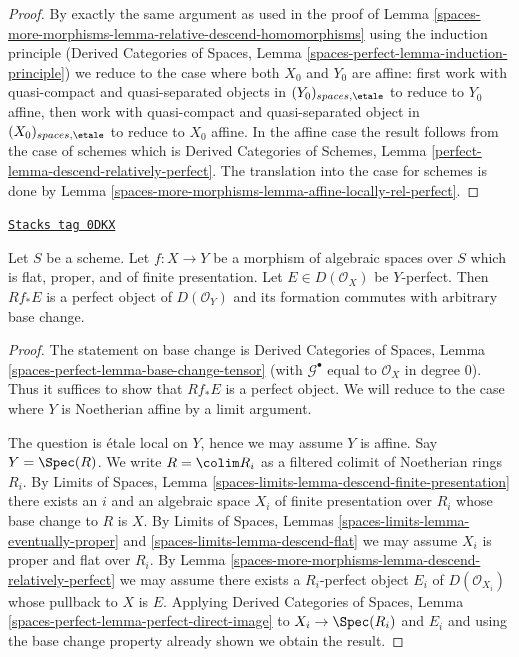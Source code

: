 \begin{proof}
\medskip\noindent
By exactly the same argument as used in
the proof of Lemma \ref{spaces-more-morphisms-lemma-relative-descend-homomorphisms}
using the induction principle
(Derived Categories of Spaces, Lemma
\ref{spaces-perfect-lemma-induction-principle})
we reduce to the case where both $X_0$ and $Y_0$
are affine: first work with quasi-compact and quasi-separated objects
in $(Y_0)_{spaces, \etale}$ to reduce to
$Y_0$ affine, then work with quasi-compact and quasi-separated object
in $(X_0)_{spaces, \etale}$ to reduce to $X_0$ affine.
In the affine case the result follows from the case of schemes which is
Derived Categories of Schemes, Lemma
\ref{perfect-lemma-descend-relatively-perfect}.
The translation into the case for schemes is done by
Lemma \ref{spaces-more-morphisms-lemma-affine-locally-rel-perfect}.
\end{proof}

\begin{lemma}
\label{spaces-more-morphisms-lemma-derived-pushforward-rel-perfect}
\href{https://stacks.math.columbia.edu/tag/0DKX}{\texttt{Stacks tag 0DKX}}

Let $S$ be a scheme.
Let $f : X \to Y$ be a morphism of algebraic spaces over $S$
which is flat, proper, and
of finite presentation. Let $E \in D(\mathcal{O}_X)$ be $Y$-perfect.
Then $Rf_*E$ is a perfect object of $D(\mathcal{O}_Y)$
and its formation commutes with arbitrary base change.
\end{lemma}

\begin{proof}
The statement on base change is Derived Categories of Spaces,
Lemma \ref{spaces-perfect-lemma-base-change-tensor} (with
$\mathcal{G}^\bullet$ equal to $\mathcal{O}_X$ in degree $0$).
Thus it suffices to show that $Rf_*E$ is a perfect object. We will reduce
to the case where $Y$ is Noetherian affine by a limit argument.

\medskip\noindent
The question is \'etale local on $Y$, hence we may assume $Y$ is affine.
Say $Y = \Spec(R)$. We write $R = \colim R_i$ as a filtered colimit
of Noetherian rings $R_i$. By Limits of Spaces, Lemma
\ref{spaces-limits-lemma-descend-finite-presentation}
there exists an $i$ and an algebraic space
$X_i$ of finite presentation over $R_i$
whose base change to $R$ is $X$. By
Limits of Spaces, Lemmas \ref{spaces-limits-lemma-eventually-proper} and
\ref{spaces-limits-lemma-descend-flat}
we may assume $X_i$ is proper and flat over $R_i$.
By Lemma \ref{spaces-more-morphisms-lemma-descend-relatively-perfect}
we may assume there exists a $R_i$-perfect object $E_i$ of
$D(\mathcal{O}_{X_i})$ whose pullback to $X$ is $E$.
Applying Derived Categories of Spaces,
Lemma \ref{spaces-perfect-lemma-perfect-direct-image}
to $X_i \to \Spec(R_i)$ and $E_i$ and using the
base change property already shown we obtain the result.
\end{proof}

